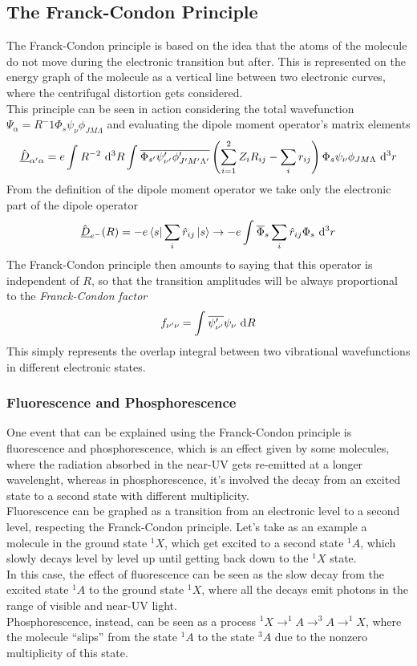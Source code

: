 \documentclass[../qm.tex]{subfiles}
\begin{document}
	\subsection{The Franck-Condon Principle}
	The Franck-Condon principle is based on the idea that the atoms of the molecule do not move during the electronic transition but after. This is represented on the energy graph of the molecule as a vertical line between two electronic curves, where the centrifugal distortion gets considered.\\
	This principle can be seen in action considering the total wavefunction $\Psi_\alpha=R^-1\Phi_s\psi_\nu\phi_{JM\Lambda}$ and evaluating the dipole moment operator's matrix elements
	\begin{equation}
		\vecopr{D}_{\alpha'\alpha}=e\int_{}^{}R^{-2}\diff[3]{R}\int_{}^{}\cc{\Phi_{s'}\psi_{\nu'}'\phi_{J'M'\Lambda'}'}\left( \sum_{i=1}^2Z_iR_{ij}-\sum_{i}r_{ij} \right)\Phi_s\psi_\nu\phi_{JM\Lambda}\diff[3]{r}
		\label{eq:frankcondon}
	\end{equation}
	From the definition of the dipole moment operator we take only the electronic part of the dipole operator
	\begin{equation*}
		\vecopr{D}_{e^-}(R)=-e\bra{s}\sum_i\opr{r}_{ij}\ket{s}\to-e\int_{}^{}\cc{\Phi}_s\sum_i\opr{r}_{ij}\Phi_s\diff[3]{r}
	\end{equation*}
	The Franck-Condon principle then amounts to saying that this operator is independent of $R$, so that the transition amplitudes will be always proportional to the \textit{Franck-Condon factor}
	\begin{equation}
		f_{\nu'\nu}=\int_{}^{}\cc{\psi_{\nu'}'}\psi_{\nu}\diff{R}
		\label{eq:franckcondonfactor}
	\end{equation}
	This simply represents the overlap integral between two vibrational wavefunctions in different electronic states.
	\subsubsection{Fluorescence and Phosphorescence}
	One event that can be explained using the Franck-Condon principle is fluorescence and phosphorescence, which is an effect given by some molecules, where the radiation absorbed in the near-UV gets re-emitted at a longer wavelenght, whereas in phosphorescence, it's involved the decay from an excited state to a second state with different multiplicity.\\
	Fluorescence can be graphed as a transition from an electronic level to a second level, respecting the Franck-Condon principle. Let's take as an example a molecule in the ground state $^1X$, which get excited to a second state $^1A$, which slowly decays level by level up until getting back down to the $^1X$ state.\\
	In this case, the effect of fluorescence can be seen as the slow decay from the excited state $^1A$ to the ground state $^1X$, where all the decays emit photons in the range of visible and near-UV light.\\
	Phosphorescence, instead, can be seen as a process $^1X\to^1A\to^3A\to^1X$, where the molecule ``slips'' from the state $^1A$ to the state $^3A$ due to the nonzero multiplicity of this state.
\end{document}
